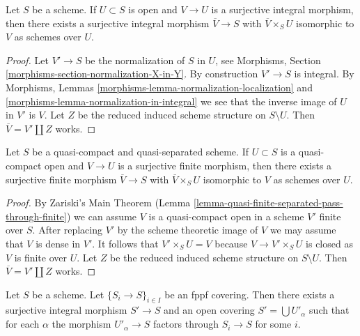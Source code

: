 \begin{lemma}
\label{lemma-extend-integral-surjective-morphisms}
Let $S$ be a scheme. If $U \subset S$ is open and $V \to U$ is a surjective
integral morphism, then there exists a surjective integral
morphism $\overline{V} \to S$ with $\overline{V} \times_S U$
isomorphic to $V$ as schemes over $U$.
\end{lemma}

\begin{proof}
Let $V' \to S$ be the normalization of $S$ in $U$, see
Morphisms, Section \ref{morphisms-section-normalization-X-in-Y}.
By construction $V' \to S$ is integral.
By Morphisms, Lemmas \ref{morphisms-lemma-normalization-localization} and
\ref{morphisms-lemma-normalization-in-integral} we see that
the inverse image of $U$ in $V'$ is $V$. Let $Z$ be the reduced
induced scheme structure on $S \setminus U$. Then
$\overline{V} = V' \amalg Z$ works.
\end{proof}

\begin{lemma}
\label{lemma-extend-finite-surjective-morphisms}
Let $S$ be a quasi-compact and quasi-separated scheme.
If $U \subset S$ is a quasi-compact open
and $V \to U$ is a surjective finite morphism, then there exists a
surjective finite morphism $\overline{V} \to S$ with $\overline{V} \times_S U$
isomorphic to $V$ as schemes over $U$.
\end{lemma}

\begin{proof}
By Zariski's Main Theorem
(Lemma \ref{lemma-quasi-finite-separated-pass-through-finite})
we can assume $V$ is a quasi-compact open in a scheme $V'$
finite over $S$. After replacing $V'$ by the scheme theoretic image
of $V$ we may assume that $V$ is dense in $V'$.
It follows that $V' \times_S U = V$ because $V \to V' \times_S U$
is closed as $V$ is finite over $U$. Let $Z$ be the reduced
induced scheme structure on $S \setminus U$. Then
$\overline{V} = V' \amalg Z$ works.
\end{proof}

\begin{lemma}
\label{lemma-dominate-fppf-integral}
Let $S$ be a scheme. Let $\{S_i \to S\}_{i \in I}$ be an fppf covering.
Then there exists a surjective integral morphism $S' \to S$ and an
open covering $S' = \bigcup U'_\alpha$ such that for each $\alpha$ the
morphism $U'_\alpha \to S$ factors through $S_i \to S$ for some $i$.
\end{lemma}

